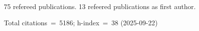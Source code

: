 75 refereed publications. 13 refeered publications as first author.

Total citations~=~5186; h-index~=~38 (2025-09-22)